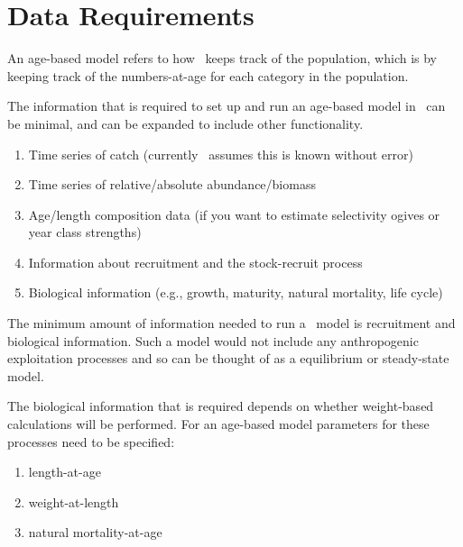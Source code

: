 \section{Data Requirements}\label{sec:data_requirements}

 An age-based model refers to how \CNAME\ keeps track of the population, which is by keeping track of the numbers-at-age for each category in the population.

The information that is required to set up and run an age-based model in \CNAME\ can be minimal, and can be expanded to include other functionality.

\begin{enumerate}
	\item Time series of catch (currently \CNAME\ assumes this is known without error)
	\item Time series of relative/absolute abundance/biomass
	\item Age/length composition data (if you want to estimate selectivity ogives or year class strengths)
	\item Information about recruitment and the stock-recruit process
	\item Biological information (e.g., growth, maturity, natural mortality, life cycle)
\end{enumerate}

The minimum amount of information needed to run a \CNAME\ model is recruitment and biological information. Such a model would not include any anthropogenic exploitation processes and so can be thought of as a equilibrium or steady-state model.

The biological information that is required depends on whether weight-based calculations will be performed. For an age-based model parameters for these processes need to be specified:

\begin{enumerate}
	\item length-at-age 
	\item weight-at-length 
	\item natural mortality-at-age 
\end{enumerate}

